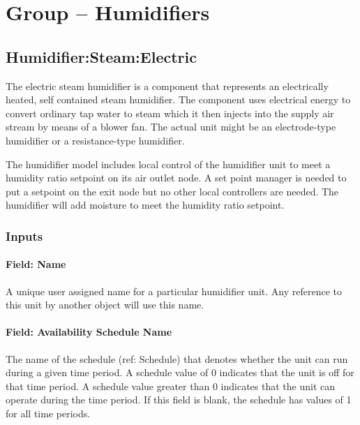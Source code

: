 \section{Group -- Humidifiers}\label{group-humidifiers}

\subsection{Humidifier:Steam:Electric}\label{humidifiersteamelectric}

The electric steam humidifier is a component that represents an electrically heated, self contained steam humidifier. The component uses electrical energy to convert ordinary tap water to steam which it then injects into the supply air stream by means of a blower fan. The actual unit might be an electrode-type humidifier or a resistance-type humidifier.

The humidifier model includes local control of the humidifier unit to meet a humidity ratio setpoint on its air outlet node. A set point manager is needed to put a setpoint on the exit node but no other local controllers are needed. The humidifier will add moisture to meet the humidity ratio setpoint.

\subsubsection{Inputs}\label{inputs-023}

\paragraph{Field: Name}\label{field-name-022}

A unique user assigned name for a particular humidifier unit. Any reference to this unit by another object will use this name.

\paragraph{Field: Availability Schedule Name}\label{field-availability-schedule-name-010}

The name of the schedule (ref: Schedule) that denotes whether the unit can run during a given time period. A schedule value of 0 indicates that the unit is off for that time period. A schedule value greater than 0 indicates that the unit can operate during the time period. If this field is blank, the schedule has values of 1 for all time periods.


